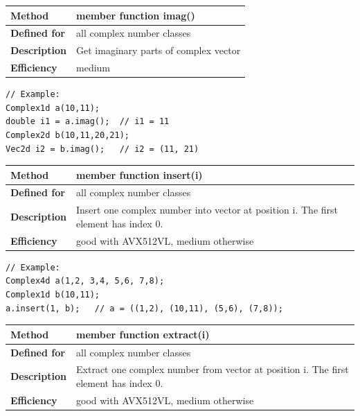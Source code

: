\documentclass[11pt,a4paper,oneside,openright]{report}
\newcommand{\vspacesmall}{\vspace{3mm}}
\newcommand{\vspacebig}{\vspace{6mm}}
\begin{document}
\begin{tabular}{|p{25mm}|p{100mm}|}
\hline
\bfseries Method & member function imag() \\ \hline
\bfseries Defined for & all complex number classes \\ \hline
\bfseries Description & Get imaginary parts of complex vector \\ \hline
\bfseries Efficiency & medium \\ \hline
\end{tabular}
\vspacesmall

\begin{lstlisting}[frame=none]
// Example:
Complex1d a(10,11);
double i1 = a.imag();  // i1 = 11
Complex2d b(10,11,20,21);
Vec2d i2 = b.imag();   // i2 = (11, 21)
\end{lstlisting}
\vspacebig


\begin{tabular}{|p{25mm}|p{100mm}|}
\hline
\bfseries Method & member function insert(i) \\ \hline
\bfseries Defined for & all complex number classes \\ \hline
\bfseries Description & Insert one complex number into vector at position i. \newline
The first element has index 0. \\ \hline
\bfseries Efficiency & good with AVX512VL, medium otherwise \\ \hline
\end{tabular}
\vspacesmall

\begin{lstlisting}[frame=none]
// Example:
Complex4d a(1,2, 3,4, 5,6, 7,8);
Complex1d b(10,11);
a.insert(1, b);   // a = ((1,2), (10,11), (5,6), (7,8));
\end{lstlisting}
\vspacebig


\begin{tabular}{|p{25mm}|p{100mm}|}
\hline
\bfseries Method & member function extract(i) \\ \hline
\bfseries Defined for & all complex number classes \\ \hline
\bfseries Description & Extract one complex number from vector at position i. \newline
The first element has index 0. \\ \hline
\bfseries Efficiency & good with AVX512VL, medium otherwise \\ \hline
\end{tabular}
\vspacesmall
\end{document}
